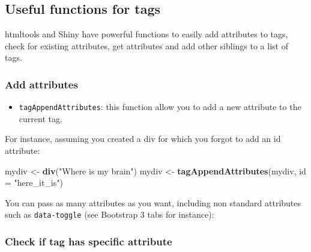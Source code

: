 \documentclass[]{book}
\newenvironment{Shaded}{\begin{snugshade}}{\end{snugshade}}
\newcommand{\CommentTok}[1]{\textcolor[rgb]{0.56,0.35,0.01}{\textit{#1}}}
\newcommand{\DataTypeTok}[1]{\textcolor[rgb]{0.13,0.29,0.53}{#1}}
\newcommand{\KeywordTok}[1]{\textcolor[rgb]{0.13,0.29,0.53}{\textbf{#1}}}
\newcommand{\NormalTok}[1]{#1}
\newcommand{\OperatorTok}[1]{\textcolor[rgb]{0.81,0.36,0.00}{\textbf{#1}}}
\newcommand{\StringTok}[1]{\textcolor[rgb]{0.31,0.60,0.02}{#1}}
\providecommand{\tightlist}{%
  \setlength{\itemsep}{0pt}\setlength{\parskip}{0pt}}
\begin{document}
\hypertarget{useful-functions-for-tags}{%
\subsection{Useful functions for tags}\label{useful-functions-for-tags}}

htmltools and Shiny have powerful functions to easily add attributes to tags, check for existing attributes, get attributes and add other siblings to a list of tags.

\hypertarget{add-attributes}{%
\subsubsection{Add attributes}\label{add-attributes}}

\begin{itemize}
\tightlist
\item
  \texttt{tagAppendAttributes}: this function allow you to add a new attribute to the current tag.
\end{itemize}

For instance, assuming you created a div for which you forgot to add an id attribute:

\begin{Shaded}
\begin{Highlighting}[]
\NormalTok{mydiv <-}\StringTok{ }\KeywordTok{div}\NormalTok{(}\StringTok{"Where is my brain"}\NormalTok{)}
\NormalTok{mydiv <-}\StringTok{ }\KeywordTok{tagAppendAttributes}\NormalTok{(mydiv, }\DataTypeTok{id =} \StringTok{"here_it_is"}\NormalTok{)}
\end{Highlighting}
\end{Shaded}

You can pass as many attributes as you want, including non standard attributes such as \texttt{data-toggle} (see Bootstrap 3 tabs for instance):

\begin{Shaded}
\end{Shaded}

\hypertarget{check-if-tag-has-specific-attribute}{%
\subsubsection{Check if tag has specific attribute}\label{check-if-tag-has-specific-attribute}}
\end{document}
